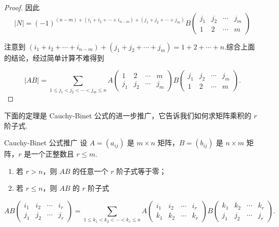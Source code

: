 \begin{proof}
    因此
    \[ |N| = (-1)^{(n-m) + (i_1 + i_2 + \cdots + i_{n-m}) + (j_1 + j_2 + \cdots + j_m)} B
    \begin{pmatrix}
        j_1 & j_2 & \cdots & j_m \\
        1 & 2 & \cdots & m
    \end{pmatrix}
    \]

    注意到 $ (i_1 + i_2 + \cdots + i_{n-m}) + (j_1 + j_2 + \cdots + j_m) = 1 + 2 + \cdots + n $.综合上面的结论，经过简单计算不难得到

    \[ |AB| = \sum_{1 \leqslant j_1 < j_2 < \cdots < j_m \leqslant n} A
    \begin{pmatrix}
        1 & 2 & \cdots & m \\
        j_1 & j_2 & \cdots & j_m
    \end{pmatrix}
    B
    \begin{pmatrix}
        j_1 & j_2 & \cdots & j_m \\
        1 & 2 & \cdots & m
    \end{pmatrix}.
    \]
\end{proof}

下面的定理是 Cauchy-Binet 公式的进一步推广，它告诉我们如何求矩阵乘积的 $r$ 阶子式.

\begin{theorem}{}{Cauchy-Binet 公式推广}
    设 $A = (a_{ij})$ 是 $m \times n$ 矩阵，$B = (b_{ij})$ 是 $n \times m$ 矩阵，$r$ 是一个正整数且 $r \leqslant m$.
    \begin{enumerate}
        \item 若 $r > n$，则 $AB$ 的任意一个 $r$ 阶子式等于零；
        \item 若 $r \leqslant n$，则 $AB$ 的 $r$ 阶子式
    \end{enumerate}
    \[
        AB
        \begin{pmatrix}
            i_1 & i_2 & \cdots & i_r \\
            j_1 & j_2 & \cdots & j_r
        \end{pmatrix}
        = \sum_{1 \leqslant k_1 < k_2 < \cdots < k_r \leqslant n} A
        \begin{pmatrix}
            i_1 & i_2 & \cdots & i_r \\
            k_1 & k_2 & \cdots & k_r
        \end{pmatrix}
        B
        \begin{pmatrix}
            k_1 & k_2 & \cdots & k_r \\
            j_1 & j_2 & \cdots & j_r
        \end{pmatrix}.
    \]
\end{theorem}

